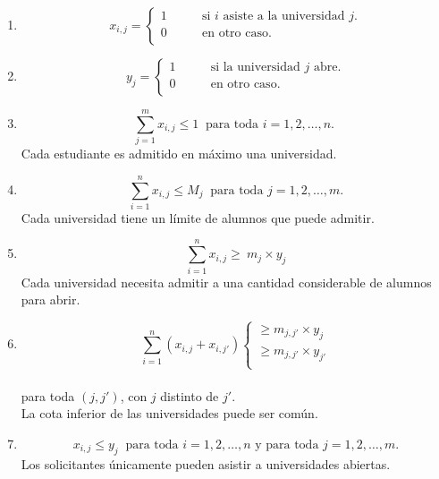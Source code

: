 \begin{enumerate}
\item \begin{equation} \label{r1}
x_{i,j}= 
\begin{cases}
1 & \qquad \text{si $i$ asiste a la universidad $j$.} \\
0 &\qquad\text{en otro caso.}\ \\ 
\end{cases} \end{equation}
\item \begin{equation} y_{j}= 
\begin{cases}
1 & \qquad \text{si la universidad $j$ abre.} \\
0 &\qquad\text{en otro caso.} \\ 
\end{cases} \end{equation}
\item \begin{equation} \label{r2}
\sum_{j=1}^{m}x_{i,j} \leq1 \ \text{ para toda $i=1,2,\ldots,n$. }
\end{equation} Cada estudiante es admitido en máximo una universidad. 
\item \begin{equation} \label{r3}
\sum_{i=1}^{n} x_{i,j} \leq M_j\ \text{ para toda $j=1,2,\dots,m$.} 
\end{equation}
Cada universidad tiene un límite de alumnos que puede admitir.
\item \begin{equation} \label{r4}
\sum_{i=1}^{n} x_{i,j} \geq\ m_j\times y_j 
\end{equation}
Cada universidad necesita admitir a una cantidad considerable de alumnos para abrir.
\item \begin{equation} \label{r5}
\sum_{i=1}^{n} (x_{i,j}+x_{i,j'}) 
\begin{cases}
\geq m_{j,j'} \times y_j \\
\geq m_{j,j'} \times y_{j'} \\
\end{cases}
\end{equation} \\
para toda $(j,j')$, con $j$ distinto de $j'$. \\
La cota inferior de las universidades puede ser común.
\item \begin{equation} \label{r6}
x_{i,j} \leq y_j \ \text{ para toda $i=1,2,\ldots,n$ y para toda $j=1,2,\ldots,m$.}
\end{equation}
Los solicitantes únicamente pueden asistir a universidades abiertas.

\end{enumerate}

